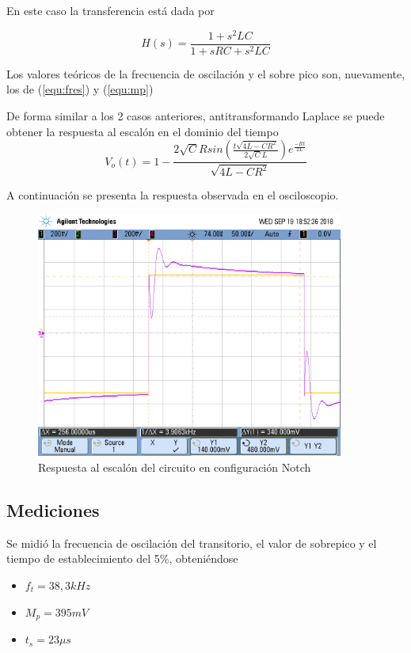 En este caso la transferencia está dada por 

\begin{equation}
    H(s)=\frac{1+s^ {2}LC}{1+sRC+s^ {2}LC}
\label{eq:BandReject}
\end{equation}

Los valores teóricos de la frecuencia de oscilación y el sobre pico son, nuevamente, los de (\ref{equ:fres}) y (\ref{equ:mp})

De forma similar a los 2 casos anteriores, antitransformando Laplace se puede obtener la respuesta al escalón en el dominio del tiempo
\begin{equation}
    V_o(t)=1-\frac{2\sqrt{C}Rsin(\frac{t\sqrt{4L-CR^2}}{2\sqrt{C}L})e^{\frac{-Rt}{2L}}}{\sqrt{4L-CR^2}}
\end{equation}

A continuación se presenta la respuesta observada en el osciloscopio.
\begin{figure}[H]
	\centering
	\includegraphics[width=0.9\textwidth]{Mediciones_pendrive_alan/ej4sobrepiconotch.png}
\caption{Respuesta al escalón del circuito en configuración Notch}
	\label{fig:notchescalon}
\end{figure}


\subsection{Mediciones}
Se midió la frecuencia de oscilación del transitorio, el valor de sobrepico y el tiempo de establecimiento del 5\%, obteniéndose
\begin{itemize}
    \item $f_t=38,3 kHz$
    \item $M_p=395 mV$
    \item $t_s=23 \mu s$
\end{itemize}


